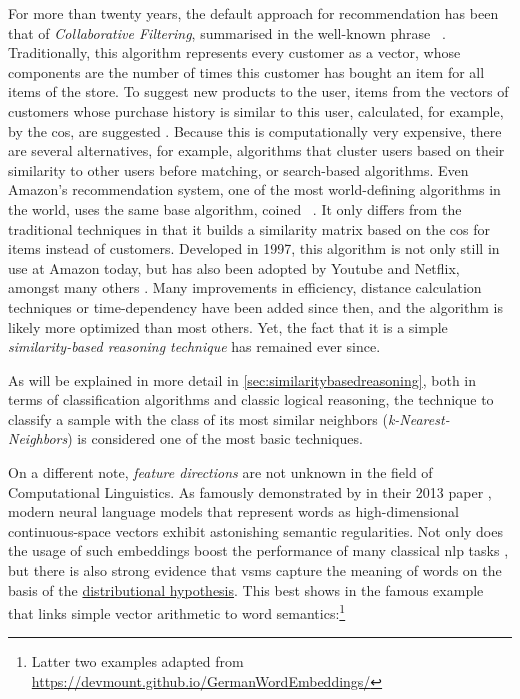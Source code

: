For more than twenty years, the default approach for recommendation has been that of \emph{Collaborative Filtering}, summarised in the well-known phrase~  \cite{Sarwar2000}. Traditionally, this algorithm represents every customer as a vector, whose components are the number of times this customer has bought an item for all items of the store. To suggest new products to the user, items from the vectors of customers whose purchase history is similar to this user, calculated, for example, by the \gls{cos}, are suggested \cite{Linden2003}. Because this is computationally very expensive, there are several alternatives, for example, algorithms that cluster users based on their similarity to other users before matching, or search-based algorithms. Even Amazon's recommendation system, one of the most world-defining algorithms in the world, uses the same base algorithm, coined~ . It only differs from the traditional techniques in that it builds a similarity matrix based on the \gls{cos} for items instead of customers. Developed in 1997, this algorithm is not only still in use at Amazon today, but has also been adopted by Youtube and Netflix, amongst many others \cite{Smith2017}. Many improvements in efficiency, distance calculation techniques or time-dependency have been added since then, and the algorithm is likely more optimized than most others. Yet, the fact that it is a simple \textit{similarity-based reasoning technique} has remained ever since. 

As will be explained in more detail in \autoref{sec:similaritybasedreasoning}, both in terms of classification algorithms and classic logical reasoning, the technique to classify a sample with the class of its most similar neighbors (\emph{k-Nearest-Neighbors}) is considered one of the most basic techniques.

On a different note, \textit{feature directions} are not unknown in the field of Computational Linguistics. As famously demonstrated by \textcite{Mikolov:Regularities} in their 2013 paper , modern neural language models that represent words as high-dimensional continuous-space vectors exhibit astonishing semantic regularities. Not only does the usage of such embeddings boost the performance of many classical \gls{nlp} tasks \cite{Mikolov2013a,Le2014, Devlin2019}, but there is also strong evidence that \glspl{vsm} capture the meaning of words on the basis of the \hyperref[sec:bow_hypothesis]{distributional hypothesis}. This best shows in the famous example that links simple vector arithmetic to word semantics:\footnote{Latter two examples adapted from \url{https://devmount.github.io/GermanWordEmbeddings/} }

